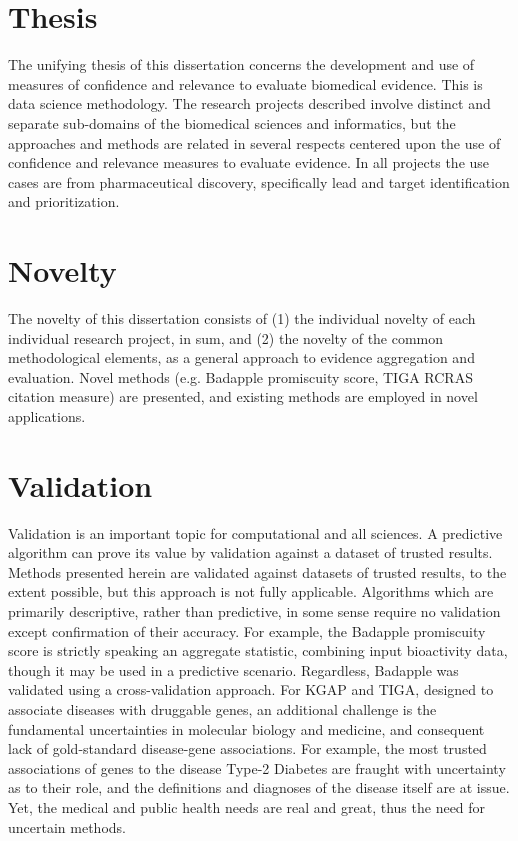 \section{Thesis}

The unifying thesis of this dissertation concerns the development and use of measures of confidence and relevance to evaluate biomedical evidence. This is data science methodology. The research projects described involve distinct and separate sub-domains of the biomedical sciences and informatics, but the approaches and methods are related in several respects centered upon the use of confidence and relevance measures to evaluate evidence. In all projects the use cases are from pharmaceutical discovery, specifically lead and target identification and prioritization.  

\section{Novelty}

The novelty of this dissertation consists of (1) the individual novelty of each individual research project, in sum, and (2) the novelty of the common methodological elements, as a general approach to evidence aggregation and evaluation. Novel methods (e.g. Badapple promiscuity score, TIGA RCRAS citation measure) are presented, and existing methods are employed in novel applications.

\section{Validation}

Validation is an important topic for computational and all sciences. A predictive algorithm can prove its value by validation against a dataset of trusted results. Methods presented herein are validated against datasets of trusted results, to the extent possible, but this approach is not fully applicable. Algorithms which are primarily descriptive, rather than predictive, in some sense require no validation except confirmation of their accuracy. For example, the Badapple promiscuity score is strictly speaking an aggregate statistic, combining input bioactivity data, though it may be used in a predictive scenario. Regardless, Badapple was validated using a cross-validation approach. For KGAP and TIGA, designed to associate diseases with druggable genes, an additional challenge is the fundamental uncertainties in molecular biology and medicine, and consequent lack of gold-standard disease-gene associations. For example, the most trusted associations of genes to the disease Type-2 Diabetes are fraught with uncertainty as to their role, and the definitions and diagnoses of the disease itself are at issue. Yet, the medical and public health needs are real and great, thus the need for uncertain methods. 

